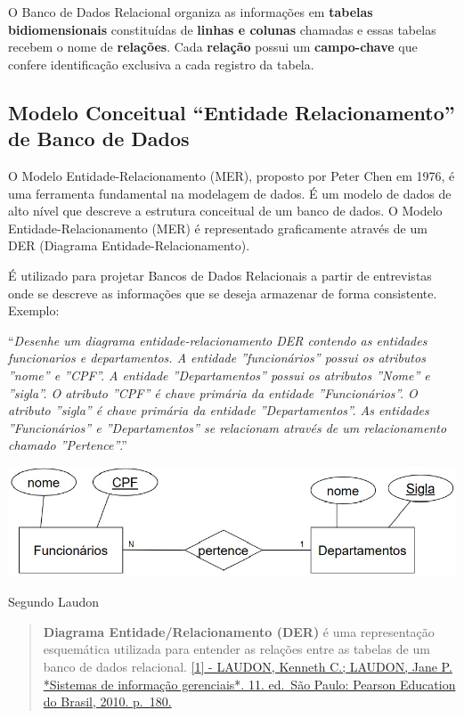 \documentclass[
]{book}
\begin{document}
O Banco de Dados Relacional organiza as informações em \textbf{tabelas bidiomensionais} constituídas de \textbf{linhas e colunas} chamadas e essas tabelas recebem o nome de \textbf{relações}. Cada \textbf{relação} possui um \textbf{campo-chave} que confere identificação exclusiva a cada registro da tabela.

\subsection{Modelo Conceitual ``Entidade Relacionamento'' de Banco de Dados}\label{modelo-conceitual-entidade-relacionamento-de-banco-de-dados}

O Modelo Entidade-Relacionamento (MER), proposto por Peter Chen em 1976, é uma ferramenta fundamental na modelagem de dados. É um modelo de dados de alto nível que descreve a estrutura conceitual de um banco de dados. O Modelo Entidade-Relacionamento (MER) é representado graficamente através de um DER (Diagrama Entidade-Relacionamento).

É utilizado para projetar Bancos de Dados Relacionais a partir de entrevistas onde se descreve as informações que se deseja armazenar de forma consistente. Exemplo:

``\emph{Desenhe um diagrama entidade-relacionamento DER contendo as entidades funcionarios e departamentos. A entidade ''funcionários'' possui os atributos ''nome'' e ''CPF''. A entidade ''Departamentos'' possui os atributos ''Nome'' e ''sigla''. O atributo ''CPF'' é chave primária da entidade ''Funcionários''. O atributo ''sigla'' é chave primária da entidade ''Departamentos''. As entidades ''Funcionários'' e ''Departamentos'' se relacionam através de um relacionamento chamado ''Pertence''}.''

\includegraphics{images/5-bi/02-Modelo-Entidade-Relacionamento.jpg}

Segundo Laudon

\begin{quote}
\textbf{Diagrama Entidade/Relacionamento (DER)} é uma representação esquemática utilizada para entender as relações entre as tabelas de um banco de dados relacional. \hyperref[laudon-kenneth-c.-laudon-jane-p.-sistemas-de-informauxe7uxe3o-gerenciais.-11.-ed.-suxe3o-paulo-pearson-education-do-brasil-2010.-p.-180.]{{[}1{]} - LAUDON, Kenneth C.; LAUDON, Jane P. *Sistemas de informação gerenciais*. 11. ed.~São Paulo: Pearson Education do Brasil, 2010. p.~180.}
\end{quote}
\end{document}
